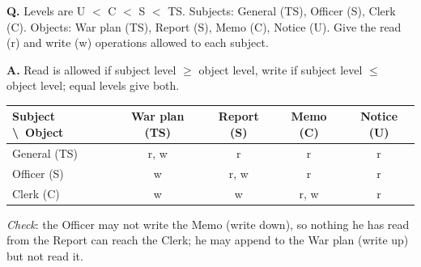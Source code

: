 \begin{worked}
\textbf{Q.} Levels are U $<$ C $<$ S $<$ TS. Subjects: General (TS), Officer (S), Clerk (C). Objects: War plan (TS), Report (S), Memo (C), Notice (U). Give the read (r) and write (w) operations allowed to each subject.

\textbf{A.} Read is allowed if subject level $\ge$ object level, write if subject level $\le$ object level; equal levels give both.
\begin{center}\small
\begin{tabular}{@{}l c c c c@{}}
\toprule
Subject \textbackslash\ Object & War plan (TS) & Report (S) & Memo (C) & Notice (U)\\
\midrule
General (TS) & r, w & r & r & r\\
Officer (S) & w & r, w & r & r\\
Clerk (C) & w & w & r, w & r\\
\bottomrule
\end{tabular}
\end{center}
\emph{Check}: the Officer may not write the Memo (write down), so nothing he has read from the Report can reach the Clerk; he may append to the War plan (write up) but not read it.
\end{worked}

